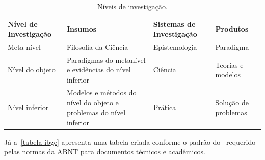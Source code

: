 \begin{table}[htb]
\ABNTEXfontereduzida{}
\caption[Níveis de investigação]{Níveis de investigação.}%
\label{tab-nivinv}
\begin{tabular}{p{2.6cm}p{6.0cm}p{2.25cm}p{3.40cm}}
  \toprule
  \textbf{Nível de Investigação} & \textbf{Insumos}                                                   & \textbf{Sistemas de Investigação} & \textbf{Produtos}    \\
  \midrule
  Meta-nível                     & Filosofia\index{filosofia} da Ciência                              & Epistemologia                     &
  Paradigma                                                                                                                                                      \\
  \midrule
  Nível do objeto                & Paradigmas do metanível e evidências do nível inferior             &
  Ciência                        & Teorias e modelos                                                                                                             \\
  \midrule
  Nível inferior                 & Modelos e métodos do nível do objeto e problemas do nível inferior & Prática                           & Solução de problemas \\
  \bottomrule
\end{tabular}
\end{table}

Já a~\autoref{tabela-ibge} apresenta uma tabela criada conforme o padrão do~ requerido pelas normas da ABNT para documentos técnicos e
acadêmicos.

\begin{table}[htb]
\end{table}


